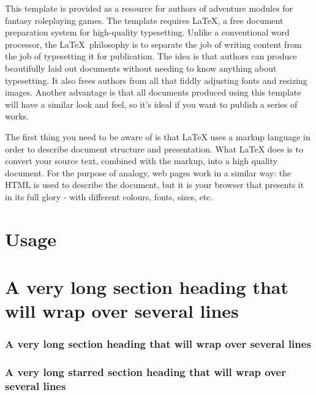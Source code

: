 \documentclass[a4paper,serif]{module}       %
\begin{document}
This template is provided as a resource for authors of adventure modules for fantasy roleplaying games.
The template requires \LaTeX, a free document preparation system for high-quality typesetting. Unlike a conventional
word processor, the \LaTeX~philosophy is to separate the job of writing content from the job of typesetting it for
publication. The idea is that authors can produce beautifully laid out documents without needing to know anything
about typesetting. It also frees authors from all that fiddly adjusting fonts and resizing images. Another advantage
is that all documents produced using this template will have a similar look and feel, so it's ideal if you want to
publish a series of works.

The first thing you need to be aware of is that LaTeX uses a markup language in order to describe document structure and presentation. What LaTeX does is to convert your source text, combined with the markup, into a high quality document. For the purpose of analogy, web pages work in a similar way: the HTML is used to describe the document, but it is your browser that presents it in its full glory - with different colours, fonts, sizes, etc.

\part{Usage}

%

\part{A very long section heading that will wrap over several lines}

\section{A very long section heading that will wrap over several lines}

\section*{A very long starred section heading that will wrap over several lines}
\end{document}

